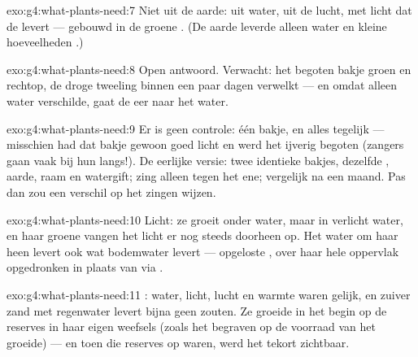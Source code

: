 \begin{solution}{exo:g4:what-plants-need:7}
Niet uit de aarde: uit water, uit de lucht, met licht dat de 
levert --- gebouwd in de groene . (De aarde leverde alleen water
en kleine hoeveelheden .)
\end{solution}

\begin{solution}{exo:g4:what-plants-need:8}
Open antwoord. Verwacht: het begoten bakje groen en rechtop, de droge
tweeling binnen een paar dagen verwelkt --- en omdat alleen water
verschilde, gaat de eer naar het water.
\end{solution}

\begin{solution}{exo:g4:what-plants-need:9}
Er is geen controle: één bakje, en alles tegelijk --- misschien had dat
bakje gewoon goed licht en werd het ijverig begoten (zangers gaan vaak
bij hun  langs!). De eerlijke versie: twee identieke bakjes,
dezelfde , aarde, raam en watergift; zing alleen tegen het ene;
vergelijk na een maand. Pas dan zou een verschil op het zingen wijzen.
\end{solution}

\begin{solution}{exo:g4:what-plants-need:10}
Licht: ze groeit onder water, maar in verlicht water, en haar groene
 vangen het licht er nog steeds doorheen op. Het water om haar
heen levert ook wat bodemwater levert --- opgeloste ,
over haar hele oppervlak opgedronken in plaats van via .
\end{solution}

\begin{solution}{exo:g4:what-plants-need:11}
: water, licht, lucht en warmte waren gelijk, en zuiver
zand met regenwater levert bijna geen zouten. Ze groeide in het begin
op de reserves in haar eigen weefsels (zoals het begraven 
op de voorraad van het  groeide) --- en toen die reserves op waren,
werd het tekort zichtbaar.
\end{solution}
